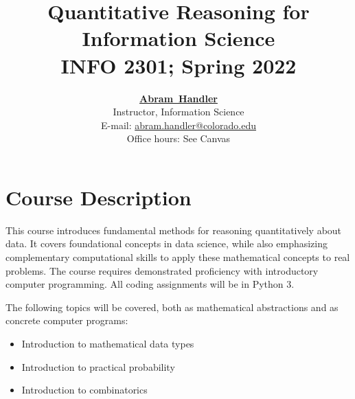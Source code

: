 \documentclass[10pt]{memoir}
\makeatletter
\def\mycoursename{Quantitative Reasoning for Information Science}
\def\mycourselisting{INFO 2301}
\def\mydate{Spring 2022}
\def\instructorAfirstname{Abram}
\def\instructorAlastname{Handler}
\def\instructorAfullname{\instructorAfirstname~\instructorAlastname}
\def\instructorAtitle{Instructor, Information Science}
\def\instructorAoffice{NA}
\def\instructorAemail{abram.handler@colorado.edu}
\def\instructorAwebsite{https://www.abehandler.com/}
\def\instructorAofficehours{See Canvas}
\makeatother
\begin{document}
\nobibliography*


\title{
    \textbf{\huge{\mycoursename}}\\
    \vspace{5pt} \normalsize{\mycourselisting}; \mydate
}


\date{
    \normalsize{
        \href{\instructorAwebsite}{\textbf{\instructorAfullname}}\\
        \instructorAtitle\\
        E-mail: \href{mailto:\instructorAemail}{\instructorAemail}\\
        Office hours: \instructorAofficehours\\\vspace{1em}
    }
}

\maketitle




\section{\textbf{Course Description}}

This course introduces fundamental methods for reasoning quantitatively about data. It covers foundational 
concepts in data science, while also emphasizing complementary computational skills to apply these mathematical concepts to real problems. The course requires demonstrated proficiency with introductory computer programming. All coding assignments will be in Python 3.

The following topics will be covered, both as mathematical abstractions and as concrete computer programs:

\begin{itemize}
\item Introduction to mathematical data types
\item Introduction to practical probability
\item Introduction to combinatorics
\end{itemize}
\end{document}
